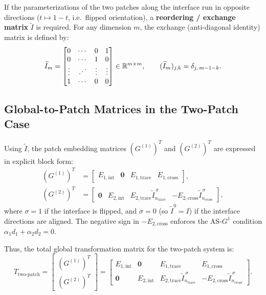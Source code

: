\documentclass[11pt,a4paper]{article}
\newcommand{\R}{\mathbb{R}}
\newcommand{\mb}[1]{\mathbf{#1}}
\newcommand{\iddots}{\mathinner{\mkern1mu\raise1pt\vbox{\kern7pt\hbox{.}}\mkern2mu\raise4pt\hbox{.}\mkern2mu\raise7pt\hbox{.}\mkern1mu}}
\begin{document}
If the parameterizations of the two patches along the interface run in opposite directions ($t \mapsto 1-t$, i.e.\ flipped orientation), a \textbf{reordering / exchange matrix} $\widetilde{I}$ is required. For any dimension $m$, the exchange (anti-diagonal identity) matrix is defined by:
\begin{equation} \label{eq:tilde_I_def}
    \widetilde{I}_m = \begin{bmatrix}
        0 & \cdots & 0 & 1 \\
        0 & \cdots & 1 & 0 \\
        \vdots & \iddots & \vdots & \vdots \\
        1 & \cdots & 0 & 0
    \end{bmatrix} \in \R^{m \times m}, \qquad (\widetilde{I}_m)_{j, k} = \delta_{j, \, m - 1 - k}.
\end{equation}

\subsection{Global-to-Patch Matrices in the Two-Patch Case}
Using $\widetilde{I}$, the patch embedding matrices $(G^{(1)})^T$ and $(G^{(2)})^T$ are expressed in explicit block form:
\begin{align}
    (G^{(1)})^T &= \begin{bmatrix} E_{1, \text{int}} & \mb{0} & E_{1, \text{trace}} & E_{1, \text{cross}} \end{bmatrix}, \label{eq:G1_twopatch} \\
    (G^{(2)})^T &= \begin{bmatrix} \mb{0} & E_{2, \text{int}} & E_{2, \text{trace}} \widetilde{I}_{n_{\text{trace}}}^{\,\sigma} & -E_{2, \text{cross}} \widetilde{I}_{n_{\text{cross}}}^{\,\sigma} \end{bmatrix}, \label{eq:G2_twopatch}
\end{align}
where $\sigma = 1$ if the interface is flipped, and $\sigma = 0$ (so $\widetilde{I}^0 = I$) if the interface directions are aligned. The negative sign in $-E_{2, \text{cross}}$ enforces the AS-$G^1$ condition $\alpha_1 d_1 + \alpha_2 d_2 = 0$.

Thus, the total global transformation matrix for the two-patch system is:
\begin{equation}
    T_{\text{two-patch}} = \begin{bmatrix} (G^{(1)})^T \\ (G^{(2)})^T \end{bmatrix} = 
    \begin{bmatrix}
        E_{1, \text{int}} & \mb{0} & E_{1, \text{trace}} & E_{1, \text{cross}} \\
        \mb{0} & E_{2, \text{int}} & E_{2, \text{trace}} \widetilde{I}_{n_{\text{trace}}}^{\,\sigma} & -E_{2, \text{cross}} \widetilde{I}_{n_{\text{cross}}}^{\,\sigma}
    \end{bmatrix}.
\end{equation}
\end{document}
